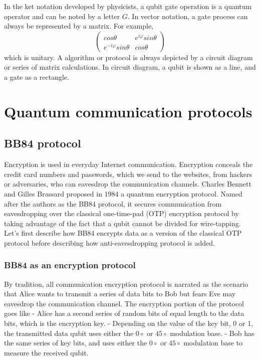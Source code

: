 \documentclass{book}
\begin{document}
In the ket notation developed by physicists, a qubit gate operation is a quantum operator and can be noted by a letter $G$. In vector notation, a gate process can always be represented by a matrix. For example,
\begin{equation}
    \begin{pmatrix}
    cos\theta & e^{i\varphi} sin\theta \\
    e^{-i\varphi} sin\theta & cos\theta
    \end{pmatrix}
\end{equation}
which is unitary.
A algorithm or protocol is always depicted by a circuit diagram or series of matrix calculations. In circuit diagram, a qubit is shown as a line, and a gate as a rectangle.

\chapter{Quantum communication protocols}

\section{BB84 protocol}
Encryption is used in everyday Internet communication. Encryption conceals the credit card numbers and passwords, which we send to the websites, from hackers or adversaries, who can eavesdrop the communication channels. Charles Bennett and Gilles Brassard proposed in 1984 a quantum encryption protocol\cite{BB84}. Named after the authors as the BB84 protocol, it secures communication from eavesdropping over the classical one-time-pad (OTP) encryption protocol\cite{Schneier} by taking advantage of the fact that a qubit cannot be divided for wire-tapping. Let's first describe how BB84 encrypts data as a version of the classical OTP protocol before describing how anti-eavesdropping protocol is added.

\subsection{BB84 as an encryption protocol}
By tradition, all communication encryption protocol is narrated as the scenario that Alice wants to transmit a series of data bits to Bob but fears Eve may eavesdrop the communication channel\cite{Schneier}. The encryption portion of the protocol goes like
- Alice has a second series of random bits of equal length to the data bits, which is the encryption key.
- Depending on the value of the key bit, 0 or 1, the transmitted data qubit uses either the $0\circ$ or $45\circ$ modulation base.
- Bob has the same series of key bits, and uses either the $0\circ$ or $45\circ$ modulation base to measure the received qubit.
\end{document}
